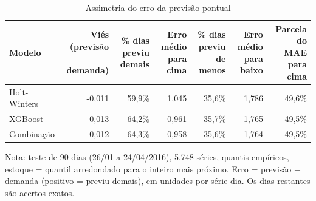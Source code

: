 \begin{table}[htbp]
\centering
\small
\caption{Assimetria do erro da previsão pontual}
\label{tab:mec_erro_pontual}
\begin{tabular}{lrrrrrr}
\toprule
Modelo & Viés (previsão $-$ demanda) & \% dias previu demais & Erro médio para cima & \% dias previu de menos & Erro médio para baixo & Parcela do MAE para cima \\
\midrule
Holt-Winters & -0,011 & 59,9\% & 1,045 & 35,6\% & 1,786 & 49,6\% \\
XGBoost & -0,013 & 64,2\% & 0,961 & 35,7\% & 1,765 & 49,5\% \\
Combinação & -0,012 & 64,3\% & 0,958 & 35,6\% & 1,764 & 49,5\% \\
\bottomrule
\end{tabular}
\par\smallskip
{\footnotesize Nota: teste de 90 dias (26/01 a 24/04/2016), 5.748 séries, quantis empíricos, estoque = quantil arredondado para o inteiro mais próximo. Erro = previsão $-$ demanda (positivo = previu demais), em unidades por série-dia. Os dias restantes são acertos exatos.}
\end{table}
